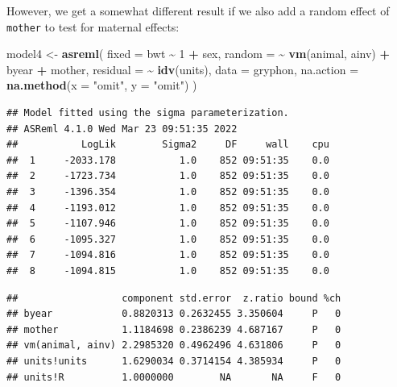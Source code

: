\documentclass[
  12pt,
]{book}
\newenvironment{Shaded}{\begin{snugshade}}{\end{snugshade}}
\newcommand{\DataTypeTok}[1]{\textcolor[rgb]{0.13,0.29,0.53}{#1}}
\newcommand{\DecValTok}[1]{\textcolor[rgb]{0.00,0.00,0.81}{#1}}
\newcommand{\KeywordTok}[1]{\textcolor[rgb]{0.13,0.29,0.53}{\textbf{#1}}}
\newcommand{\NormalTok}[1]{#1}
\newcommand{\OperatorTok}[1]{\textcolor[rgb]{0.81,0.36,0.00}{\textbf{#1}}}
\newcommand{\StringTok}[1]{\textcolor[rgb]{0.31,0.60,0.02}{#1}}
\begin{document}
However, we get a somewhat different result if we also add a random effect of \texttt{mother} to test for maternal effects:

\begin{Shaded}
\begin{Highlighting}[]
\NormalTok{model4 \textless{}{-}}\StringTok{ }\KeywordTok{asreml}\NormalTok{(}
  \DataTypeTok{fixed =}\NormalTok{ bwt }\OperatorTok{\textasciitilde{}}\StringTok{ }\DecValTok{1} \OperatorTok{+}\StringTok{ }\NormalTok{sex,}
  \DataTypeTok{random =} \OperatorTok{\textasciitilde{}}\StringTok{ }\KeywordTok{vm}\NormalTok{(animal, ainv) }\OperatorTok{+}\StringTok{ }\NormalTok{byear }\OperatorTok{+}\StringTok{ }\NormalTok{mother,}
  \DataTypeTok{residual =} \OperatorTok{\textasciitilde{}}\StringTok{ }\KeywordTok{idv}\NormalTok{(units),}
  \DataTypeTok{data =}\NormalTok{ gryphon,}
  \DataTypeTok{na.action =} \KeywordTok{na.method}\NormalTok{(}\DataTypeTok{x =} \StringTok{"omit"}\NormalTok{, }\DataTypeTok{y =} \StringTok{"omit"}\NormalTok{)}
\NormalTok{)}
\end{Highlighting}
\end{Shaded}

\begin{verbatim}
## Model fitted using the sigma parameterization.
## ASReml 4.1.0 Wed Mar 23 09:51:35 2022
##           LogLik        Sigma2     DF     wall    cpu
##  1     -2033.178           1.0    852 09:51:35    0.0
##  2     -1723.734           1.0    852 09:51:35    0.0
##  3     -1396.354           1.0    852 09:51:35    0.0
##  4     -1193.012           1.0    852 09:51:35    0.0
##  5     -1107.946           1.0    852 09:51:35    0.0
##  6     -1095.327           1.0    852 09:51:35    0.0
##  7     -1094.816           1.0    852 09:51:35    0.0
##  8     -1094.815           1.0    852 09:51:35    0.0
\end{verbatim}

\begin{Shaded}
\end{Shaded}

\begin{verbatim}
##                  component std.error  z.ratio bound %ch
## byear            0.8820313 0.2632455 3.350604     P   0
## mother           1.1184698 0.2386239 4.687167     P   0
## vm(animal, ainv) 2.2985320 0.4962496 4.631806     P   0
## units!units      1.6290034 0.3714154 4.385934     P   0
## units!R          1.0000000        NA       NA     F   0
\end{verbatim}
\end{document}
